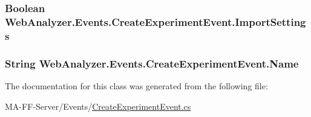 \subsubsection[{Import\+Settings}]{\setlength{\rightskip}{0pt plus 5cm}Boolean Web\+Analyzer.\+Events.\+Create\+Experiment\+Event.\+Import\+Settings\hspace{0.3cm}{\ttfamily [get]}}\label{class_web_analyzer_1_1_events_1_1_create_experiment_event_ad7acdf21b15a8eb496b29b2ee4cd5d35}
\hypertarget{class_web_analyzer_1_1_events_1_1_create_experiment_event_a6e6e3eee6e63143be6e5ab7b329533c6}{}
\subsubsection[{Name}]{\setlength{\rightskip}{0pt plus 5cm}String Web\+Analyzer.\+Events.\+Create\+Experiment\+Event.\+Name\hspace{0.3cm}{\ttfamily [get]}}\label{class_web_analyzer_1_1_events_1_1_create_experiment_event_a6e6e3eee6e63143be6e5ab7b329533c6}


The documentation for this class was generated from the following file\+:\begin{DoxyCompactItemize}
\item 
M\+A-\/\+F\+F-\/\+Server/\+Events/\hyperlink{_create_experiment_event_8cs}{Create\+Experiment\+Event.\+cs}\end{DoxyCompactItemize}
